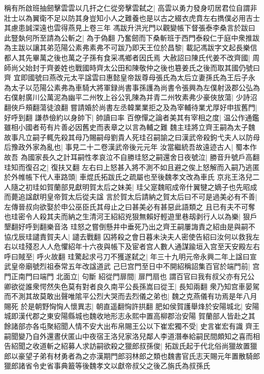 稱有所啟班抽劒擊雲雲以几扞之仁從旁擊雲弑之|{
	高雲以勇力發身叨居君位自謂非壯士以為翼衛不足以防其身豈知小人之難養也是以古之綴衣虎賁左右擕僕必用吉士其慮患誠深遠也雲得燕見上卷三年}
馮跋升洪光門以觀變帳下督張泰李桑言於跋曰此豎埶何所至請為公斬之|{
	為于偽翻}
乃奮劒而下桑斬班于西門泰殺仁于庭中衆推跋為主跋以讓其弟范陽公素弗素弗不可跋乃即天王位於昌黎|{
	載記馮跋字文起長樂信都人其先畢萬之後也萬之子孫有食采馮鄉者因氏焉}
大赦詔曰陳氏代姜不改齊國|{
	周師尚父始封于齊姜姓也戰國時齊太公田和陳敬仲之後也簒姜氏之後而取其國仍號曰齊}
宜即國號曰燕改元太平諡雲曰惠懿皇帝跋尊母張氏為太后立妻孫氏為王后子永為太子以范陽公素弗為車騎大將軍録尚書事孫護為尚書令張興為左僕射汲郡公弘為右僕射廣川公萬泥為幽平二州牧上谷公乳陳為并青二州牧素弗少豪俠放蕩|{
	少詩沼翻俠戶頰翻蕩徒浪翻}
嘗請婚於尚書左丞韓業業拒之及為宰輔待業尤厚好申拔舊門|{
	好呼到翻}
謙恭儉約以身帥下|{
	帥讀曰率}
百僚憚之論者美其有宰相之度|{
	温公作通鑑雖相小國者苟有片善必因舊史而表章之以言為輔之難}
魏主珪將立齊王嗣為太子魏故事凡立嗣子輒先殺其母乃賜嗣母劉貴人死珪召嗣諭之曰漢武帝殺鉤弋夫人以防母后豫政外家為亂也|{
	事見二十二卷漢武帝後元元年}
汝當繼統吾故遠迹古人|{
	蜀本作故吾}
為國家長久之計耳嗣性孝哀泣不自勝珪怒之嗣還舍日夜號泣|{
	勝音升號戶高翻}
珪知而復召之|{
	復扶又翻}
左右曰上怒甚入將不測不如且避之俟上怒解而入嗣乃逃匿於外帷帳下代人車路頭|{
	車焜氏拓跋氏之疏屬也至後魏孝文改為車氏}
京兆王洛兒二人隨之初珪如賀蘭部見獻明賀太后之妹美|{
	珪父寔魏昭成帝什翼犍之嫡子也先昭成而薨追諡獻明皇帝賀太后從夫諡}
言於賀太后請納之賀太后曰不可是過美必有不善|{
	左傳晉叔向欲娶於申公巫臣氏其母止之曰甚美必有甚惡此語類之}
且已有夫不可奪也珪密令人殺其夫而納之生清河王紹紹兇狠無賴好輕遊里巷刼剥行人以為樂|{
	狠戶墾翻好呼到翻樂音洛}
珪怒之嘗倒懸井中垂死乃出之齊王嗣屢誨責之紹由是與嗣不協戊辰珪譴責賀夫人|{
	譴去戰翻}
囚將殺之會日暮未決夫人密使告紹曰汝何以救我左右以珪殘忍人人危懼紹年十六夜與帳下及宦者宫人數人通謀踰垣入宫至天安殿左右呼曰賊至|{
	呼火故翻}
珪驚起求弓刀不獲遂弑之|{
	年三十九明元帝永興二年上諡曰宣武皇帝廟號烈祖泰常五年改諡道武}
己巳宫門至日中不開紹稱詔集百官於端門前|{
	宫門正南門曰端門}
北面立|{
	句斷}
紹從門扉間|{
	扉門扇也}
謂百官曰我有叔父亦有兄公卿欲從誰衆愕然失色莫有對者良久南平公長孫嵩曰從王|{
	長知兩翻}
衆乃知宫車晏駕而不測其故莫敢出聲唯隂平公烈大哭而去烈儀之弟也|{
	魏之克燕儀有功焉是年八月賜死}
於是朝野恟恟人懷異志|{
	朝直遥翻恟許拱翻}
肥如侯賀護舉烽於安陽城北|{
	安陽城即漢代郡之東安陽縣城也魏收地形志永熙中置高柳郡治安陽}
賀蘭部人皆赴之其餘諸部亦各屯聚紹聞人情不安大出布帛賜王公以下崔宏獨不受|{
	史言崔宏有識}
齊王嗣聞變乃自外還晝伏匿山中夜宿王洛兒家洛兒鄰人李道潛奉給嗣民間頗知之喜而相告紹聞之收道斬之紹募人求訪嗣欲殺之獵郎叔孫俊|{
	拓跋氏起于代北俗尚獵故置獵郎以豪望子弟有材勇者為之亦漢期門郎羽林郎之類也魏書官氏志天賜元年置散騎郎獵郎諸省令史省事典籖等後魏孝文以獻帝叔父之後乙旃氏為叔孫氏}
